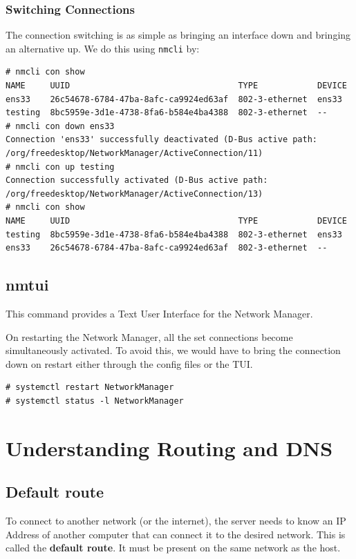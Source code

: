 \subsubsection{Switching Connections}
The connection switching is as simple as bringing an interface down and bringing an alternative up. We do this using \verb|nmcli| by:
\vspace{-15pt}
\begin{verbatim}
# nmcli con show
NAME     UUID                                  TYPE            DEVICE 
ens33    26c54678-6784-47ba-8afc-ca9924ed63af  802-3-ethernet  ens33  
testing  8bc5959e-3d1e-4738-8fa6-b584e4ba4388  802-3-ethernet  --     
# nmcli con down ens33
Connection 'ens33' successfully deactivated (D-Bus active path: /org/freedesktop/NetworkManager/ActiveConnection/11)
# nmcli con up testing
Connection successfully activated (D-Bus active path: /org/freedesktop/NetworkManager/ActiveConnection/13)
# nmcli con show
NAME     UUID                                  TYPE            DEVICE 
testing  8bc5959e-3d1e-4738-8fa6-b584e4ba4388  802-3-ethernet  ens33  
ens33    26c54678-6784-47ba-8afc-ca9924ed63af  802-3-ethernet  --     
\end{verbatim}
\vspace{-10pt}

\subsection{nmtui}
This command provides a Text User Interface for the Network Manager. 

On restarting the Network Manager, all the set connections become simultaneously activated. To avoid this, we would have to bring the connection down on restart either through the config files or the TUI. 

\vspace{-15pt}
\begin{verbatim}
# systemctl restart NetworkManager
# systemctl status -l NetworkManager
\end{verbatim}
\vspace{-10pt}

	\section{Understanding Routing and DNS}
\subsection{Default route}
To connect to another network (or the internet), the server needs to know an IP Address of another computer that can connect it to the desired network. This is called the \textbf{default route}. It must be present on the same network as the host. 

